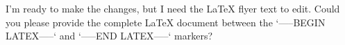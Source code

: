 I’m ready to make the changes, but I need the LaTeX flyer text to edit. Could you please provide the complete LaTeX document between the `-----BEGIN LATEX-----` and `-----END LATEX-----` markers?